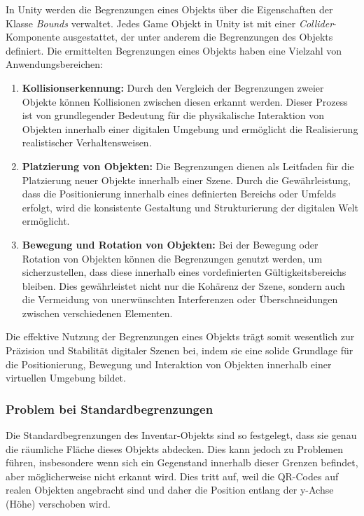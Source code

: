 In Unity werden die Begrenzungen eines Objekts über die Eigenschaften der Klasse \textit{Bounds} verwaltet. Jedes Game
Objekt in Unity ist mit einer \textit{Collider}-Komponente ausgestattet, der unter anderem die Begrenzungen des Objekts
definiert. Die ermittelten Begrenzungen eines Objekts haben eine Vielzahl von Anwendungsbereichen:

\begin{enumerate}
    \item \textbf{Kollisionserkennung:} Durch den Vergleich der Begrenzungen zweier Objekte können Kollisionen zwischen
    diesen erkannt werden. Dieser Prozess ist von grundlegender Bedeutung für die physikalische Interaktion von Objekten
    innerhalb einer digitalen Umgebung und ermöglicht die Realisierung realistischer Verhaltensweisen.

    \item \textbf{Platzierung von Objekten:} Die Begrenzungen dienen als Leitfaden für die Platzierung neuer Objekte
    innerhalb einer Szene. Durch die Gewährleistung, dass die Positionierung innerhalb eines definierten Bereichs oder
    Umfelds erfolgt, wird die konsistente Gestaltung und Strukturierung der digitalen Welt ermöglicht.

    \item \textbf{Bewegung und Rotation von Objekten:} Bei der Bewegung oder Rotation von Objekten können die Begrenzungen
    genutzt werden, um sicherzustellen, dass diese innerhalb eines vordefinierten Gültigkeitsbereichs bleiben. Dies
    gewährleistet nicht nur die Kohärenz der Szene, sondern auch die Vermeidung von unerwünschten Interferenzen oder
    Überschneidungen zwischen verschiedenen Elementen.
\end{enumerate}

Die effektive Nutzung der Begrenzungen eines Objekts trägt somit wesentlich zur Präzision und Stabilität digitaler Szenen
bei, indem sie eine solide Grundlage für die Positionierung, Bewegung und Interaktion von Objekten innerhalb einer virtuellen
Umgebung bildet.

\subsubsection{Problem bei Standardbegrenzungen}
Die Standardbegrenzungen des Inventar-Objekts sind so festgelegt, dass sie genau die räumliche Fläche dieses Objekts abdecken.
Dies kann jedoch zu Problemen führen, insbesondere wenn sich ein Gegenstand innerhalb dieser Grenzen befindet, aber
möglicherweise nicht erkannt wird. Dies tritt auf, weil die QR-Codes auf realen Objekten angebracht sind und daher die
Position entlang der y-Achse (Höhe) verschoben wird.

